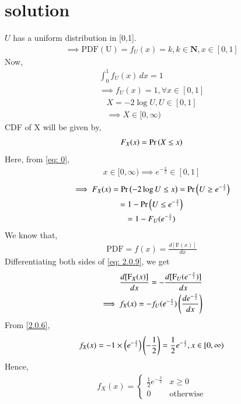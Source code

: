 \documentclass[journal,12pt,twocolumn]{IEEEtran}
\begin{document}
\section{solution}
$U$ has a uniform distribution in [0,1].
\begin{align}
    \implies \mathrm{PDF(U)}=f_U(x)=k, k\in\textbf{N}, x\in[0,1]
\end{align}
Now,
\begin{align}
    \int_{0}^1 f_U(x)\,dx=1\\
    \implies f_U(x)=1, \forall x\in[0,1]\label{2.0.6}
\end{align}
\begin{align}
    X=-2\log{U},U\in[0,1]\\
    \implies X\in[0,\infty)\label{eq: 0}
\end{align}
CDF of X will be given by,
\begin{align}
F_{X}(x) = \Pr\left(X\leq x\right)  
\end{align}
Here, from \eqref{eq: 0},
\begin{align}
x\in[0,\infty)
    \implies e^{-\frac{x}{2}}\in [0,1]\label{eq: 2.0.8}
\end{align}
\begin{multline}
    \implies F_X(x)  =\Pr\left(-2\log U\leq x\right) 
    =\Pr\left(U\geq e^{-\frac{x}{2}}\right)\\
    =1-\Pr\left(U\leq e^{-\frac{x}{2}}\right)\\
    =1-F_{U}(e^{-\frac{x}{2}})\label{eq: 2.0.9}
    \end{multline}
We know that,
\begin{align}
    \mathrm{PDF}=f(x)=\frac{d[\mathrm{F}(x)]}{dx}
\end{align}
Differentiating both sides of \eqref{eq: 2.0.9}, we get
\begin{align}
    \frac{d[\mathrm{F}_X(x)]}{dx}=-\frac{d[\mathrm{F}_U(e^{-\frac{x}{2}})]}{dx}\label{eq: 2.0.3}\\
    \implies f_{X}(x)=-f_{U}(e^{-\frac{x}{2}})\left(\frac{de^{-\frac{x}{2}}}{dx}\right)
    \end{align}
  From \eqref{2.0.6},
  \begin{align}
      f_X(x)=-1\times \left(e^{-\frac{x}{2}}\right)\left(-\frac{1}{2}\right)=\frac{1}{2}e^{-\frac{x}{2}},x\in[0,\infty)
  \end{align}
  Hence,
  \begin{align}
  f_X(x)=
\begin{cases}
\frac{1}{2}e^{-\frac{x}{2}} & x\geq0\\
0 & \mathrm{otherwise}
\end{cases}
\end{align}
\end{document}
